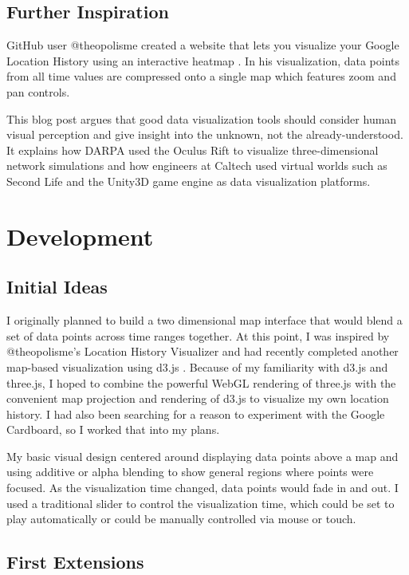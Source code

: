 \documentclass[conference]{acmsiggraph}
\begin{document}
\subsection{Further Inspiration}

GitHub user @theopolisme created a website that lets you visualize your Google
Location History using an interactive heatmap
\cite{location-history-visualizer}. In his visualization, data points from all
time values are compressed onto a single map which features zoom and pan
controls.

This blog post \cite{VR:BigData} argues that good data visualization tools
should consider human visual perception and give insight into the unknown, not
the already-understood. It explains how DARPA used the Oculus Rift to visualize
three-dimensional network simulations and how engineers at Caltech used virtual
worlds such as Second Life and the Unity3D game engine as data visualization
platforms.



\section{Development}

\subsection{Initial Ideas}

I originally planned to build a two dimensional map interface that would blend
a set of data points across time ranges together. At this point, I was inspired
by @theopolisme's Location History Visualizer and had recently completed another
map-based visualization using d3.js \cite{D3.js}. Because of my familiarity with
d3.js and three.js, I hoped to combine the powerful WebGL rendering of three.js
with the convenient map projection and rendering of d3.js to visualize my own
location history. I had also been searching for a reason to experiment with the
Google Cardboard, so I worked that into my plans.

My basic visual design centered around displaying data points above a map and
using additive or alpha blending to show general regions where points were
focused. As the visualization time changed, data points would fade in and out.
I used a traditional slider to control the visualization time, which could be
set to play automatically or could be manually controlled via mouse or touch.

\subsection{First Extensions}
\end{document}
